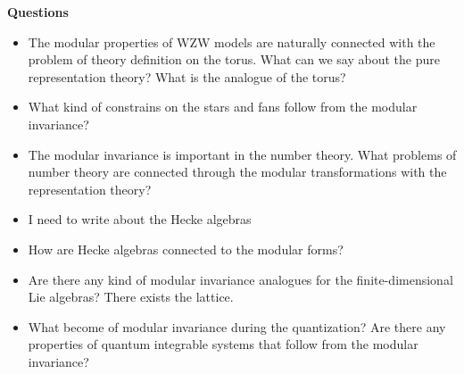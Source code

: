 \documentclass[a4paper,12pt]{article}
\theoremstyle{definition} \newtheorem{Def}{Definition}
\begin{document}
{\bf Questions}
\begin{itemize}
\item The modular properties of WZW models are naturally connected with the problem of theory definition on the torus. What can we say about the pure representation theory? What is the analogue of the torus?
\item What kind of constrains on the stars and fans follow from the modular invariance?
\item The modular invariance is important in the number theory. What problems of number theory are connected through the modular transformations with the representation theory?
\item I need to write about the Hecke algebras
\item How are Hecke algebras connected to the modular forms?
\item Are there any kind of modular invariance analogues for the finite-dimensional Lie algebras? There exists the lattice.
\item What become of modular invariance during the quantization? Are there any properties of quantum integrable systems that follow from the modular invariance?
\end{itemize}

{}

\end{document}
